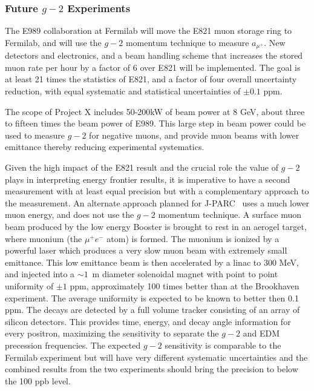 \subsubsection{ Future $g-2$ Experiments}

The E989 collaboration
at Fermilab will move the E821 muon storage ring to Fermilab, and
will use the  $g-2$ momentum technique to measure $a_{\mu^+}$.
 New detectors and electronics, and a
beam handling scheme that increases the stored muon rate per hour
 by a factor of 6
over E821 will be implemented.  The goal is at least 21 times the
statistics of E821, and a factor of four overall uncertainty reduction, with
equal systematic and statistical uncertainties of $\pm 0.1$ ppm.

The scope of Project X includes 50-200kW of beam power at 8 GeV,
about three to fifteen times the beam power of E989.  This large step in beam
power could be used to measure $g-2$ for negative muons,
and provide muon beams with lower emittance thereby reducing
experimental systematics. 

Given the high impact of the E821 result and the 
crucial role the value of $g-2$ plays in interpreting energy frontier results, 
it is imperative to have a second measurement with at least equal 
precision but with a complementary approach to the measurement. 
An alternate approach planned for J-PARC~\cite{JPARC-Lg2} uses a much lower muon
energy, and does not use the  $g-2$ momentum technique. A surface muon beam
produced by  the low energy Booster is brought to rest in an aerogel
target, where muonium (the $\mu^+ e^-$ atom) is formed.  The muonium
is ionized by a powerful laser which produces a very slow muon beam with
extremely small emittance. This low emittance beam is then accelerated by a
linac to 300 MeV, and injected into a  $\sim 1$~m diameter
solenoidal magnet with point to point
uniformity of $\pm 1$ ppm, approximately 100 times better than at the Brookhaven experiment.  
The average uniformity is expected to be known to better then 0.1 ppm.  The decays are detected 
by a full volume tracker consisting of an array of silicon
detectors.  This provides time, energy, and decay angle information for every positron, maximizing
 the sensitivity to separate the  $g-2$ and EDM precession frequencies.  The expected   $g-2$ sensitivity 
 is comparable to the
 Fermilab experiment but will have very different systematic uncertainties and the combined results 
 from the two experiments should bring the precision to below the 100 ppb level.


